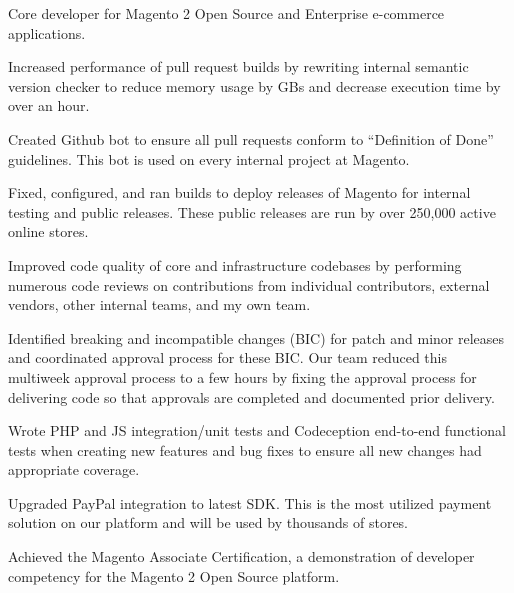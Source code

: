 \documentclass[line]{resume}
\begin{document}
\begin{myitemize}
	\item Core developer for Magento 2 Open Source and Enterprise e-commerce applications.
	\item Increased performance of pull request builds by rewriting internal semantic version checker to reduce memory usage by GBs and decrease execution time by over an hour.
	\item Created Github bot to ensure all pull requests conform to ``Definition of Done'' guidelines. This bot is used on every internal project at Magento.
	\item Fixed, configured, and ran builds to deploy releases of Magento for internal testing and public releases. These public releases are run by over 250,000 active online stores.
	\item Improved code quality of core and infrastructure codebases by performing numerous code reviews on contributions from individual contributors, external vendors, other internal teams, and my own team.
	\item Identified breaking and incompatible changes (BIC) for patch and minor releases and coordinated approval process for these BIC. Our team reduced this multiweek approval process to a few hours by fixing the approval process for delivering code so that approvals are completed and documented prior delivery.
	\item Wrote PHP and JS integration/unit tests and Codeception end-to-end functional tests when creating new features and bug fixes to ensure all new changes had appropriate coverage.
	\item Upgraded PayPal integration to latest SDK. This is the most utilized payment solution on our platform and will be used by thousands of stores.
	\item Achieved the Magento Associate Certification, a demonstration of developer competency for the Magento 2 Open Source platform.
\end{myitemize}
\vspace{2px}
\vspace{2px}

\vspace{2px}
\end{document}
